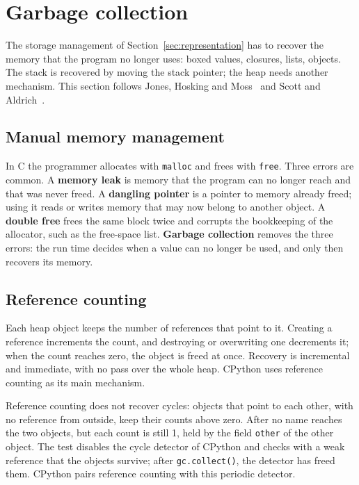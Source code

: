 \section{Garbage collection}
\label{sec:gc}

The storage management of Section~\ref{sec:representation} has to recover the
memory that the program no longer uses: boxed values, closures, lists, objects.
The stack is recovered by moving the stack pointer; the heap needs another
mechanism. This section follows Jones, Hosking and Moss~\cite{jones2011gc}
and Scott and Aldrich~\cite{scott2025pragmatics}.

\subsection{Manual memory management}

In C the programmer allocates with \texttt{malloc} and frees with
\texttt{free}. Three errors are common. A \textbf{memory leak} is memory that the
program can no longer reach and that was never freed. A \textbf{dangling
pointer} is a pointer to memory already freed; using it reads or writes memory
that may now belong to another object. A \textbf{double free} frees the same
block twice and corrupts the bookkeeping of the allocator, such as the
free-space list. \textbf{Garbage collection} removes the three errors: the run
time decides when a value can no longer be used, and only then recovers its
memory.

\subsection{Reference counting}

Each heap object keeps the number of references that point to it. Creating a
reference increments the count, and destroying or overwriting one decrements
it; when the count reaches zero, the object is freed at once. Recovery is
incremental and immediate, with no pass over the whole heap. CPython uses
reference counting as its main mechanism.

Reference counting does not recover cycles: objects that point to each other,
with no reference from outside, keep their counts above zero.
After
no name reaches the two objects, but each count is still 1, held by the field
\texttt{other} of the other object. The test disables the cycle detector of
CPython and checks with a weak reference that the objects survive; after
\texttt{gc.collect()}, the detector has freed them. CPython pairs reference
counting with this periodic detector.

